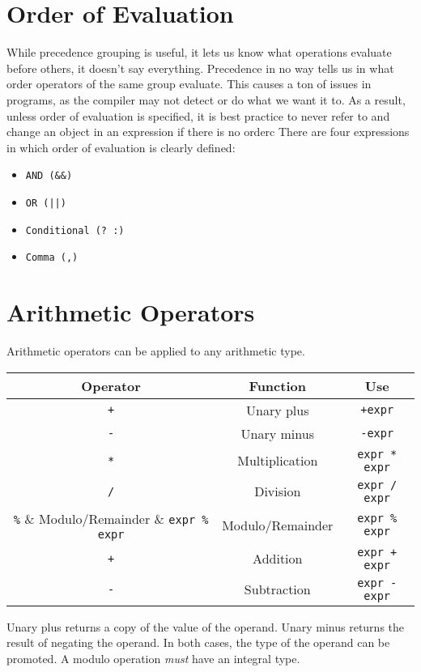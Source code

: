 \documentclass[12pt, a4paper]{report}
\begin{document}
\section{Order of Evaluation}
While precedence grouping is useful, it lets us know what operations evaluate before others, it doesn't say everything.
Precedence in no way tells us in what order operators of the same group evaluate.
This causes a ton of issues in programs, as the compiler may not detect or do what we want it to.
As a result, unless order of evaluation is specified, it is best practice to never refer to and change an object in an expression if there is no orderc
There are four expressions in which order of evaluation is clearly defined:
\begin{itemize}
  \item \verb|AND (&&)|
  \item \verb=OR (||)=
  \item \verb|Conditional (? :)|
  \item \verb|Comma (,)| 
\end{itemize}
\section{Arithmetic Operators}
Arithmetic operators can be applied to any arithmetic type.
\begin{center}
  \begin{tabular}{ |c|c|c| }
    \hline
    \textbf{Operator} & \textbf{Function} & \textbf{Use} \\
    \hline
    \verb|+| & Unary plus & \verb|+expr| \\
    \hline
    \verb|-| & Unary minus & \verb|-expr| \\
    \hline
    \hline
    \verb|*| & Multiplication & \verb|expr * expr| \\
    \hline
    \verb|/| & Division & \verb|expr / expr| \\
    \hline
    \verb|%| & Modulo/Remainder & \verb|expr % expr| \\
    \hline
    \hline
    \verb|+| & Addition & \verb|expr + expr| \\
    \hline
    \verb|-| & Subtraction & \verb|expr - expr| \\
    \hline
  \end{tabular}
\end{center}
Unary plus returns a copy of the value of the operand.
Unary minus returns the result of negating the operand.
In both cases, the type of the operand can be promoted.
A modulo operation \emph{must} have an integral type.
\end{document}
